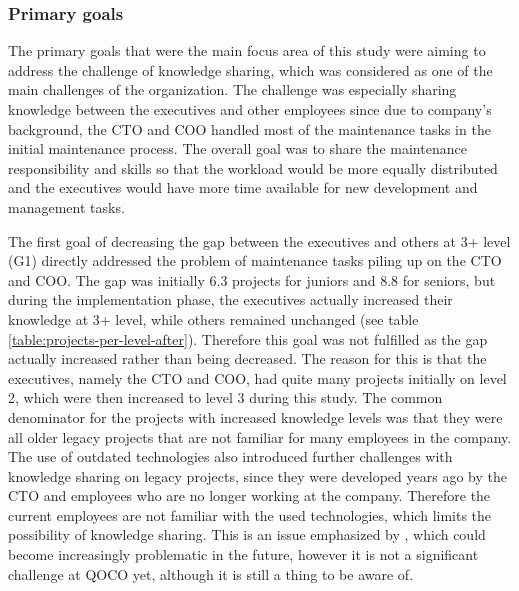 \subsubsection*{Primary goals}

The primary goals that were the main focus area of this study were aiming to address the challenge of knowledge sharing, which was considered as one of the main challenges of the organization.
The challenge was especially sharing knowledge between the executives and other employees since due to company's background, the CTO and COO handled most of the maintenance tasks in the initial maintenance process.
The overall goal was to share the maintenance responsibility and skills so that the workload would be more equally distributed and the executives would have more time available for new development and
management tasks.

The first goal of decreasing the gap between the executives and others at 3+ level (G1) directly addressed the problem of maintenance tasks piling up on the CTO and COO. The gap was initially 6.3 projects for juniors and
8.8 for seniors, but during the implementation phase, the executives actually increased their knowledge at 3+ level, while others remained unchanged (see table \ref{table:projects-per-level-after}). Therefore this goal was not fulfilled as the gap actually increased
rather than being decreased. The reason for this is that the executives, namely the CTO and COO, had quite many projects initially on level 2, which were then increased to level 3 during this study.
The common denominator for the projects with increased knowledge levels was that they were all older legacy projects that are not familiar for many employees in the company. The use of outdated technologies
also introduced further challenges with knowledge sharing on legacy projects, since they were developed years ago by the CTO and employees who are no longer working at the company. Therefore the current employees are not
familiar with the used technologies, which limits the possibility of knowledge sharing. This is an issue emphasized by \citet{Richardson2007}, which could become increasingly problematic in the future, however
it is not a significant challenge at QOCO yet, although it is still a thing to be aware of.

